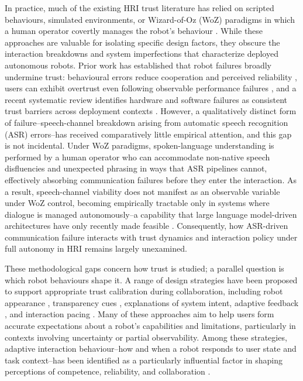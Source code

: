 \documentclass[
  authoryear,
  doubleblind,
  3p]{elsarticle}
\begin{document}
In practice, much of the existing HRI trust literature has relied on
scripted behaviours, simulated environments, or Wizard-of-Oz (WoZ)
paradigms in which a human operator covertly manages the robot's
behaviour \citep{bettencourt2025}. While these approaches are valuable
for isolating specific design factors, they obscure the interaction
breakdowns and system imperfections that characterize deployed
autonomous robots. Prior work has established that robot failures
broadly undermine trust: behavioural errors reduce cooperation and
perceived reliability \citep{salem2015}, users can exhibit overtrust
even following observable performance failures \citep{robinette2016},
and a recent systematic review identifies hardware and software failures
as consistent trust barriers across deployment contexts
\citep{gratsjova2025}. However, a qualitatively distinct form of
failure--speech-channel breakdown arising from automatic speech
recognition (ASR) errors--has received comparatively little empirical
attention, and this gap is not incidental. Under WoZ paradigms,
spoken-language understanding is performed by a human operator who can
accommodate non-native speech disfluencies and unexpected phrasing in
ways that ASR pipelines cannot, effectively absorbing communication
failures before they enter the interaction. As a result, speech-channel
viability does not manifest as an observable variable under WoZ control,
becoming empirically tractable only in systems where dialogue is managed
autonomously--a capability that large language model-driven
architectures have only recently made feasible \citep{weia}.
Consequently, how ASR-driven communication failure interacts with trust
dynamics and interaction policy under full autonomy in HRI remains
largely unexamined.

These methodological gaps concern how trust is studied; a parallel
question is which robot behaviours shape it. A range of design
strategies have been proposed to support appropriate trust calibration
during collaboration, including robot appearance \citep{nicolas2021},
transparency cues \citep{zhang2019}, explanations of system intent,
adaptive feedback \citep{val-calvo2020}, and interaction pacing
\citep{kok2020}. Many of these approaches aim to help users form
accurate expectations about a robot's capabilities and limitations,
particularly in contexts involving uncertainty or partial observability.
Among these strategies, adaptive interaction behaviour--how and when a
robot responds to user state and task context--has been identified as a
particularly influential factor in shaping perceptions of competence,
reliability, and collaboration \citep{shayganfar2019, fartook2025}.
\end{document}
